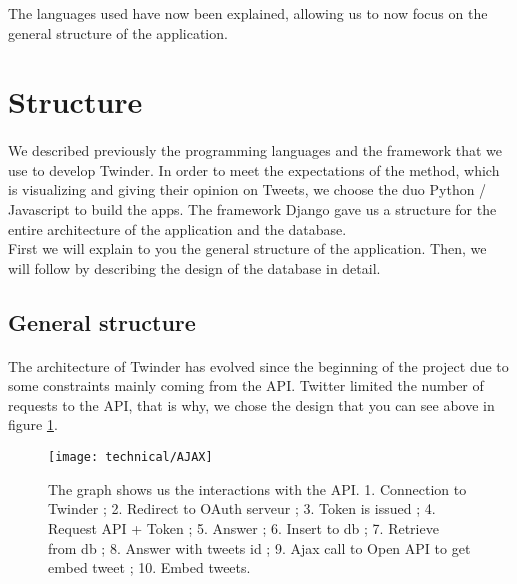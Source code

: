 The languages used have now been explained, allowing us to now focus on the general structure of the application.


\section{Structure}

\paragraph{}
We described previously the programming languages and the framework that we use to develop Twinder. In order to meet the expectations of the method, which is visualizing and giving their opinion on Tweets, we choose the duo Python / Javascript to build the apps. The framework Django gave us a structure for the entire architecture of the application and the database. \\
First we will explain to you the general structure of the application. Then, we will follow by describing the design of the database in detail.

\subsection{General structure}
\paragraph{}
The architecture of Twinder has evolved since the beginning of the project due to some constraints mainly coming from the API. Twitter limited the number of requests to the API, that is why, we chose the design that you can see above in figure \ref{fig:app_design}. \\

\begin{figure}[h] 
\centering 
\texttt{[image: technical/AJAX]} 
\caption[Connection with Twinder]{ The graph shows us the interactions with the API.
1. Connection to Twinder ;
2. Redirect to OAuth serveur ;
 3. Token is issued ;
  4. Request API + Token ;
  5. Answer ;
  6. Insert to db ;
  7. Retrieve from db ;
  8. Answer with tweets id ;
  9. Ajax call to Open API to get embed tweet ;
  10. Embed tweets.}
\label{fig:app_design} 
\end{figure}

